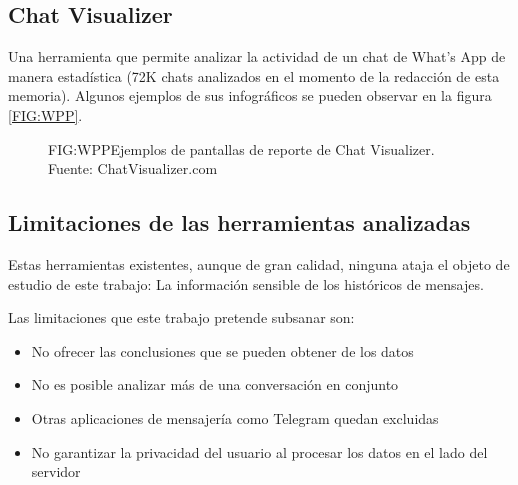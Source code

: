 \newpage

\subsection{Chat Visualizer}

Una herramienta que permite analizar la actividad de un chat de What's App de manera estadística\cite{ChatVisualizer} (72K chats analizados en el momento de la redacción de esta memoria). Algunos ejemplos de sus infográficos se pueden observar en la figura \ref{FIG:WPP}.

\begin{figure}[Chat Visualizer]{FIG:WPP}{Ejemplos de pantallas de reporte de Chat Visualizer. Fuente: ChatVisualizer.com}
\end{figure}

\subsection{Limitaciones de las herramientas analizadas}

Estas herramientas existentes, aunque de gran calidad, ninguna ataja el objeto de estudio de este trabajo: La información sensible de los históricos de mensajes.

Las limitaciones que este trabajo pretende subsanar son:
\begin{itemize}
    \item No ofrecer las conclusiones que se pueden obtener de los datos
    \item No es posible analizar más de una conversación en conjunto
    \item Otras aplicaciones de mensajería como Telegram quedan excluidas
    \item No garantizar la privacidad del usuario al procesar los datos en el lado del servidor
\end{itemize}

\newpage
